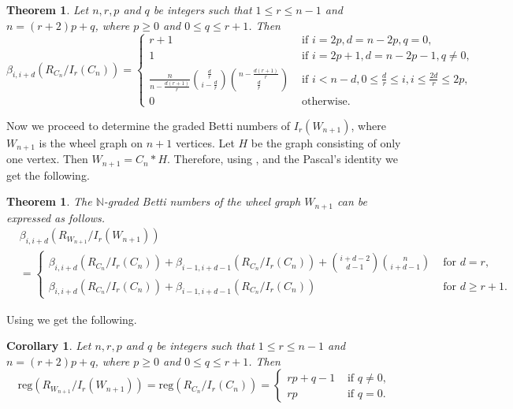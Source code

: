 \documentclass[12pt,reqno]{amsart}
\newtheorem{theorem}[proposition]{Theorem}
\newtheorem{corollary}[proposition]{Corollary}
\theoremstyle{definition}
\begin{document}
\begin{theorem}\label{cycle graph}
    Let $n,r,p$ and $q$ be integers such that $1\le r\le n-1$ and $n=(r+2)p+q$, where $p\ge 0$ and $0\le q\le r+1$. Then
    \[
    \beta_{i,i+d}(R_{C_{n}}/I_r(C_{n}))=\begin{cases}
        r+1 &\text{ if }i=2p, d=n-2p, q=0,\\
        1&\text{ if }i=2p+1, d=n-2p-1, q\neq 0,\\
        \frac{n}{n-\frac{d(r+1)}{r}}{\frac{d}{r}\choose i-\frac{d}{r}}{n-\frac{d(r+1)}{r}\choose \frac{d}{r}}&\text{ if }i<n-d,0\le \frac{d}{r}\le i,i\le \frac{2d}{r}\le 2p,\\
        0&\text{ otherwise.}
    \end{cases}
    \]
\end{theorem}

Now we proceed to determine the graded Betti numbers of $I_r(W_{n+1})$, where $W_{n+1}$ is the wheel graph on $n+1$ vertices. Let $H$ be the graph consisting of only one vertex. Then $W_{n+1}=C_n*H$. Therefore, using ,  and the Pascal's identity we get the following.

\begin{theorem}\label{wheel graph}
    The $\mathbb N$-graded Betti numbers of the wheel graph $W_{n+1}$ can be expressed as follows.
    \begin{align*}
    &\beta_{i,i+d}(R_{W_{n+1}}/I_r(W_{n+1}))\\
    &=\begin{cases}
        \beta_{i,i+d}(R_{C_n}/I_r(C_{n}))+\beta_{i-1,i+d-1}(R_{C_n}/I_r(C_{n}))+{i+d-2\choose d-1}{n\choose i+d-1} &\text{ for }d=r,\\
        \beta_{i,i+d}(R_{C_n}/I_r(C_{n}))+\beta_{i-1,i+d-1}(R_{C_n}/I_r(C_{n})) &\text{ for }d\ge r+1.
    \end{cases}
    \end{align*}
\end{theorem}

Using  we get the following.

\begin{corollary}\label{corollary 3}
    Let $n,r,p$ and $q$ be integers such that $1\le r\le n-1$ and $n=(r+2)p+q$, where $p\ge 0$ and $0\le q\le r+1$. Then
    \[
    \mathrm{reg}(R_{W_{n+1}}/I_r(W_{n+1}))=\mathrm{reg}(R_{C_n}/I_r(C_n))=\begin{cases}
        rp+q-1&\text{  if  }q\neq 0,\\
        rp&\text{  if  }q=0.
    \end{cases}
    \]
\end{corollary}
\end{document}
